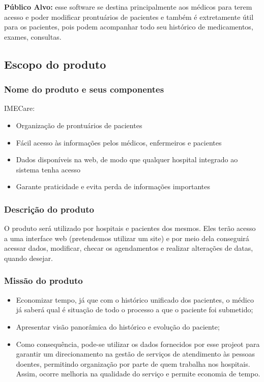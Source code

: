 \documentclass[12pt,a4paper]{report}
\begin{document}
\textbf{Público Alvo:} esse software se destina principalmente aos médicos para terem acesso e poder modificar prontuários de pacientes e também é extretamente útil para os pacientes, pois podem acompanhar todo seu histórico de medicamentos, exames, consultas.



\subsection{Escopo do produto}

\subsubsection{Nome do produto e seus componentes}
IMECare:

\begin{itemize}
\item Organização de prontuários de pacientes
\item Fácil acesso às informações pelos médicos, enfermeiros e pacientes
\item Dados disponíveis na web, de modo que qualquer hospital integrado ao sistema tenha acesso
\item Garante praticidade e evita perda de informações importantes 
\end{itemize}


\subsubsection{Descrição do produto}

O produto será utilizado por hospitais e pacientes dos mesmos. Eles terão acesso a uma interface web (pretendemos utilizar um site) e por meio dela conseguirá acessar dados, modificar, checar os agendamentos e realizar alterações de datas, quando desejar.



\subsubsection{Missão do produto}

\begin{itemize}

\item Economizar tempo, já que com o histórico unificado dos pacientes, o médico já saberá qual é situação de todo o processo a que o paciente foi submetido;
\item Apresentar visão panorâmica do histórico e evolução do paciente;
\item Como consequência, pode-se utilizar os dados fornecidos por esse projeot para garantir um direcionamento na gestão de serviços de atendimento às pessoas doentes, permitindo organização por parte de quem trabalha nos hospitais. Assim, ocorre melhoria na qualidade do serviço e permite economia de tempo.

\end{itemize}
\end{document}
